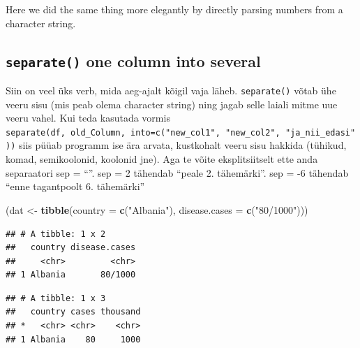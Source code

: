 \documentclass[]{book}
\newenvironment{Shaded}{\begin{snugshade}}{\end{snugshade}}
\newcommand{\KeywordTok}[1]{\textcolor[rgb]{0.13,0.29,0.53}{\textbf{#1}}}
\newcommand{\DataTypeTok}[1]{\textcolor[rgb]{0.13,0.29,0.53}{#1}}
\newcommand{\StringTok}[1]{\textcolor[rgb]{0.31,0.60,0.02}{#1}}
\newcommand{\OperatorTok}[1]{\textcolor[rgb]{0.81,0.36,0.00}{\textbf{#1}}}
\newcommand{\NormalTok}[1]{#1}
\begin{document}
Here we did the same thing more elegantly by directly parsing numbers
from a character string.

\subsection{\texorpdfstring{\texttt{separate()} one column into
several}{separate() one column into several}}\label{separate-one-column-into-several}

Siin on veel üks verb, mida aeg-ajalt kõigil vaja läheb.
\texttt{separate()} võtab ühe veeru sisu (mis peab olema character
string) ning jagab selle laiali mitme uue veeru vahel. Kui teda kasutada
vormis
\texttt{separate(df,\ old\_Column,\ into=c("new\_col1",\ "new\_col2",\ "ja\_nii\_edasi"))}
siis püüab programm ise ära arvata, kustkohalt veeru sisu hakkida
(tühikud, komad, semikoolonid, koolonid jne). Aga te võite
eksplitsiitselt ette anda separaatori sep = ``''. sep = 2 tähendab
``peale 2. tähemärki''. sep = -6 tähendab ``enne tagantpoolt 6.
tähemärki''

\begin{Shaded}
\begin{Highlighting}[]
\NormalTok{(dat <-}\StringTok{ }\KeywordTok{tibble}\NormalTok{(}\DataTypeTok{country =} \KeywordTok{c}\NormalTok{(}\StringTok{"Albania"}\NormalTok{), }\DataTypeTok{disease.cases =} \KeywordTok{c}\NormalTok{(}\StringTok{"80/1000"}\NormalTok{)))}
\end{Highlighting}
\end{Shaded}

\begin{verbatim}
## # A tibble: 1 x 2
##   country disease.cases
##     <chr>         <chr>
## 1 Albania       80/1000
\end{verbatim}

\begin{Shaded}
\end{Shaded}

\begin{verbatim}
## # A tibble: 1 x 3
##   country cases thousand
## *   <chr> <chr>    <chr>
## 1 Albania    80     1000
\end{verbatim}
\end{document}
